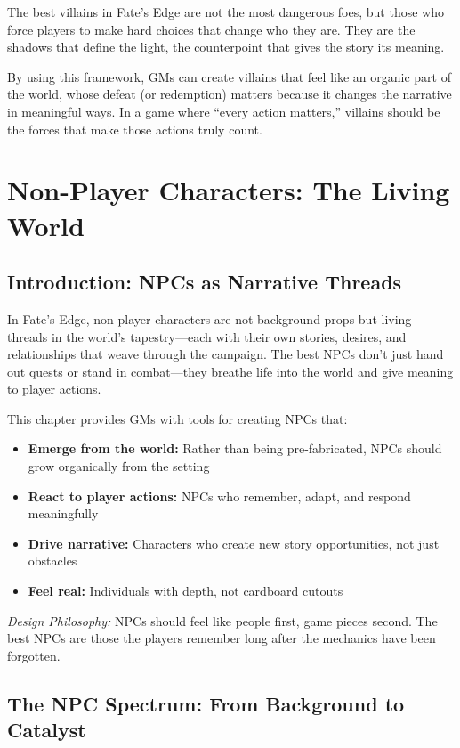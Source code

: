 \documentclass[10pt]{article}
\begin{document}
The best villains in Fate's Edge are not the most dangerous foes, but those who force players to make hard choices that change who they are. They are the shadows that define the light, the counterpoint that gives the story its meaning.

By using this framework, GMs can create villains that feel like an organic part of the world, whose defeat (or redemption) matters because it changes the narrative in meaningful ways. In a game where ``every action matters,'' villains should be the forces that make those actions truly count.

\newpage
\section{Non-Player Characters: The Living World}

\subsection{Introduction: NPCs as Narrative Threads}

In Fate's Edge, non-player characters are not background props but living threads in the world's tapestry---each with their own stories, desires, and relationships that weave through the campaign. The best NPCs don't just hand out quests or stand in combat---they breathe life into the world and give meaning to player actions.

This chapter provides GMs with tools for creating NPCs that:
\begin{itemize}
  \item \textbf{Emerge from the world:} Rather than being pre-fabricated, NPCs should grow organically from the setting
  \item \textbf{React to player actions:} NPCs who remember, adapt, and respond meaningfully
  \item \textbf{Drive narrative:} Characters who create new story opportunities, not just obstacles
  \item \textbf{Feel real:} Individuals with depth, not cardboard cutouts
\end{itemize}

\noindent\textit{Design Philosophy:} NPCs should feel like people first, game pieces second. The best NPCs are those the players remember long after the mechanics have been forgotten.

\subsection{The NPC Spectrum: From Background to Catalyst}
\end{document}

